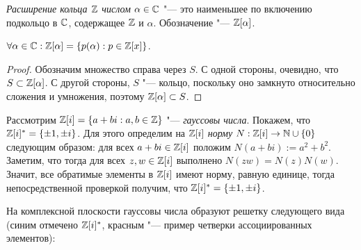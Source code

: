 \begin{definition}
	\textit{Расширение кольца $\mathbb{Z}$ числом $\alpha \in \mathbb{C}$} "--- это наименьшее по включению подкольцо в $\mathbb{C}$, содержащее $\mathbb{Z}$ и $\alpha$. Обозначение "--- $\mathbb{Z}[\alpha]$.
\end{definition}

\begin{proposition}
	$\forall \alpha \in \mathbb{C}: \mathbb{Z}[\alpha] = \{p(\alpha): p \in \mathbb{Z}[x]\}$.
\end{proposition}

\begin{proof}
	Обозначим множество справа через $S$. С одной стороны, очевидно, что $S \subset \mathbb{Z}[\alpha]$. С другой стороны, $S$ "--- кольцо, поскольку оно замкнуто относительно сложения и умножения, поэтому $\mathbb{Z}[\alpha] \subset S$.
\end{proof}

\begin{example}
	Рассмотрим $\mathbb{Z}[i] = \{a + bi: a, b \in \mathbb{Z}\}$ "--- \textit{гауссовы числа}. Покажем, что $\Z[i]^* \hm= \{\pm1, \pm i\}$. Для этого определим на $\mathbb{Z}[i]$ \textit{норму} $N : \mathbb{Z}[i] \to \mathbb{N} \cup \{0\}$ следующим образом: для всех $a + bi \in \mathbb{Z}[i]$ положим $N(a + bi) := a^2 + b^2$. Заметим, что тогда для всех $z, w \in \mathbb{Z}[i]$ выполнено $N(zw) = N(z)N(w)$. Значит, все обратимые элементы в $\mathbb{Z}[i]$ имеют норму, равную единице, тогда непосредственной проверкой получим, что $\mathbb{Z}[i]^* = \{\pm1, \pm i\}$.
	
	\pagebreak
	На комплексной плоскости гауссовы числа образуют решетку следующего вида (синим отмечено $\mathbb{Z}[i]^*$, красным "--- пример четверки ассоциированных элементов):
	\begin{center}
	\end{center}
\end{example}

